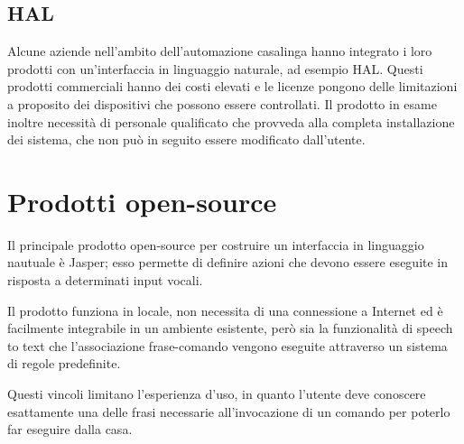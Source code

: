 \documentclass[twoside]{supsistudent}
\begin{document}
\subsection{HAL}
Alcune aziende nell'ambito dell'automazione casalinga hanno integrato i loro prodotti con un'interfaccia in linguaggio naturale, ad esempio HAL. Questi prodotti commerciali hanno dei costi elevati e le licenze pongono delle limitazioni a proposito dei dispositivi che possono essere controllati. Il prodotto in esame inoltre necessità di personale qualificato che provveda alla completa installazione dei sistema, che non può in seguito essere modificato dall'utente.\cite{HAL}

\section{Prodotti open-source}
Il principale prodotto open-source per costruire un interfaccia in linguaggio nautuale è Jasper; esso permette di definire azioni che devono essere eseguite in risposta a determinati input vocali. \cite{jasper}

Il prodotto funziona in locale, non necessita di una connessione a Internet ed è facilmente integrabile in un ambiente esistente, però sia la funzionalità di speech to text che l'associazione frase-comando vengono eseguite attraverso un sistema di regole predefinite.

Questi vincoli limitano l'esperienza d'uso, in quanto l'utente deve conoscere esattamente una delle frasi necessarie all'invocazione di un comando per poterlo far eseguire dalla casa.
\end{document}
